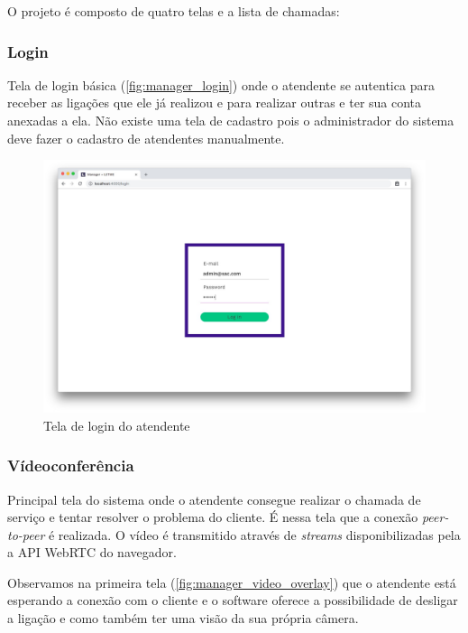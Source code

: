 O projeto é composto de quatro telas e a lista de chamadas:

\subsubsection{Login}

Tela de login básica (\autoref{fig:manager_login}) onde o atendente se autentica para receber as ligações que ele já realizou e para realizar outras e ter sua conta anexadas a ela. Não existe uma tela de cadastro pois o administrador do sistema deve fazer o cadastro de atendentes manualmente.

\begin{figure}[ht!]
	\centering
    \includegraphics[scale=0.3]{figures/screens/manager-login.jpg}
	\caption{Tela de login do atendente}
	\label{fig:manager_login}
\end{figure}

\subsubsection{Vídeoconferência}

Principal tela do sistema onde o atendente consegue realizar o chamada de serviço e tentar resolver o problema do cliente. É nessa tela que a conexão \textit{peer-to-peer} é realizada. O vídeo é transmitido através de \textit{streams} disponibilizadas pela a API WebRTC do navegador.

Observamos na primeira tela (\autoref{fig:manager_video_overlay}) que o atendente está esperando a conexão com o cliente e o software oferece a possibilidade de desligar a ligação e como também ter uma visão da sua própria câmera.


